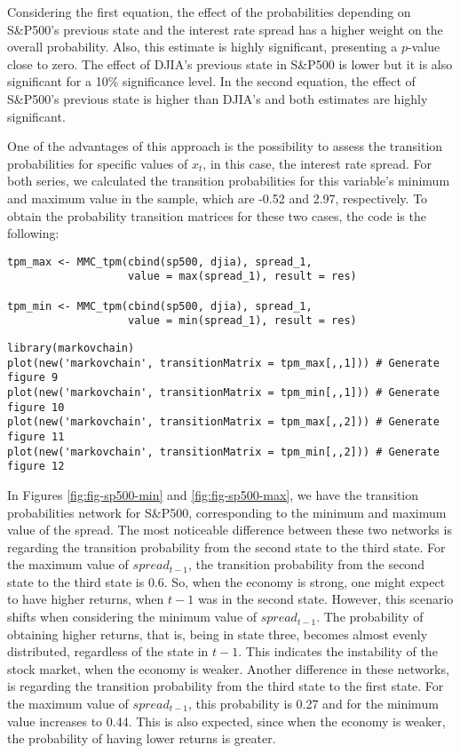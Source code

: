 Considering the first equation, the effect of the probabilities depending on S\&P500's previous state and the interest rate spread has a higher weight on the overall probability. Also, this estimate is highly significant, presenting a \(p\)-value close to zero. The effect of DJIA's previous state in S\&P500 is lower but it is also significant for a 10\% significance level. In the second equation, the effect of S\&P500's previous state is higher than DJIA's and both estimates are highly significant.

One of the advantages of this approach is the possibility to assess the transition probabilities for specific values of \(x_t\), in this case, the interest rate spread. For both series, we calculated the transition probabilities for this variable's minimum and maximum value in the sample, which are -0.52 and 2.97, respectively. To obtain the probability transition matrices for these two cases, the code is the following:

\begin{verbatim}
tpm_max <- MMC_tpm(cbind(sp500, djia), spread_1, 
                   value = max(spread_1), result = res)

tpm_min <- MMC_tpm(cbind(sp500, djia), spread_1, 
                   value = min(spread_1), result = res)
\end{verbatim}

\begin{verbatim}
library(markovchain)
plot(new('markovchain', transitionMatrix = tpm_max[,,1])) # Generate figure 9
plot(new('markovchain', transitionMatrix = tpm_min[,,1])) # Generate figure 10
plot(new('markovchain', transitionMatrix = tpm_max[,,2])) # Generate figure 11
plot(new('markovchain', transitionMatrix = tpm_min[,,2])) # Generate figure 12
\end{verbatim}

In Figures \ref{fig:fig-sp500-min} and \ref{fig:fig-sp500-max}, we have the transition probabilities network for S\&P500, corresponding to the minimum and maximum value of the spread. The most noticeable difference between these two networks is regarding the transition probability from the second state to the third state. For the maximum value of \(spread_{t-1}\), the transition probability from the second state to the third state is 0.6. So, when the economy is strong, one might expect to have higher returns, when \(t-1\) was in the second state. However, this scenario shifts when considering the minimum value of \(spread_{t-1}\). The probability of obtaining higher returns, that is, being in state three, becomes almost evenly distributed, regardless of the state in \(t-1\). This indicates the instability of the stock market, when the economy is weaker. Another difference in these networks, is regarding the transition probability from the third state to the first state. For the maximum value of \(spread_{t-1}\), this probability is 0.27 and for the minimum value increases to 0.44. This is also expected, since when the economy is weaker, the probability of having lower returns is greater.

